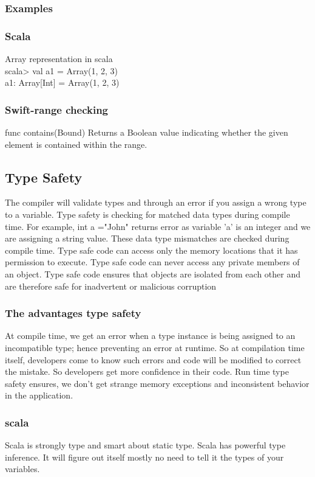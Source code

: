 \documentclass{sig-alternate}
\begin{document}
\subsubsection{Examples}
\subsubsection{Scala}
Array representation in scala \\
scala> val a1 = Array(1, 2, 3) \\
a1: Array[Int] = Array(1, 2, 3)
\subsubsection{Swift-range checking }
func contains(Bound)
Returns a Boolean value indicating whether the given element is contained within the range.


\subsection{Type Safety}
The compiler will validate types and through an error if you assign a wrong type to a variable. 
Type safety is checking for matched data types during compile time. For example, int a ="John" returns error as variable 'a' is an integer and we are assigning a string value. These data type mismatches are checked during compile time. Type safe code can access only the memory locations that it has permission to execute. Type safe code can never access any private members of an object. Type safe code ensures that objects are isolated from each other and are therefore safe for inadvertent or malicious corruption
\subsubsection{The advantages type safety }
At compile time, we get an error when a type instance is being assigned to an incompatible type; hence preventing an error at runtime. So at compilation time itself, developers come to know such errors and code will be modified to correct the mistake. So developers get more confidence in their code.
Run time type safety ensures, we don't get strange memory exceptions and inconsistent behavior in the application.

\subsubsection{scala}
Scala is strongly type and smart about static type. Scala has powerful type inference. It will figure out itself mostly no need to tell it the types of your variables. 
\end{document}
